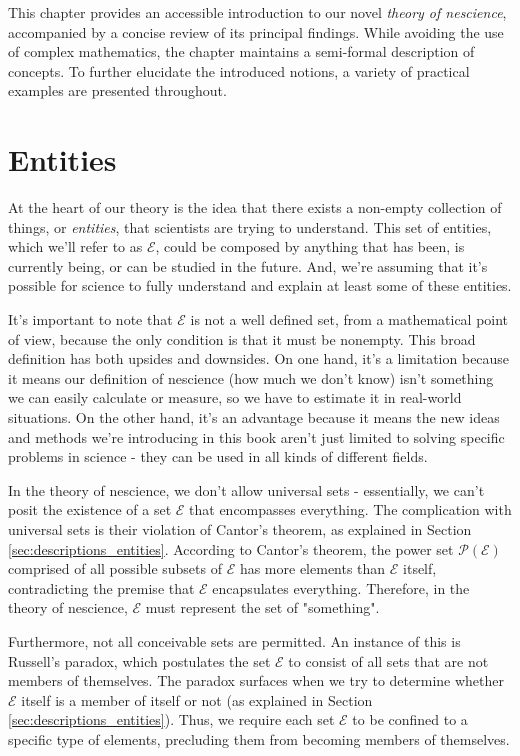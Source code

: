 This chapter provides an accessible introduction to our novel \emph{theory of nescience}, accompanied by a concise review of its principal findings. While avoiding the use of complex mathematics, the chapter maintains a semi-formal description of concepts. To further elucidate the introduced notions, a variety of practical examples are presented throughout.

%
%

\section{Entities}

At the heart of our theory is the idea that there exists a non-empty collection of things, or \emph{entities}, that scientists are trying to understand. This set of entities, which we'll refer to as $\mathcal{E}$, could be composed by anything that has been, is currently being, or can be studied in the future. And, we're assuming that it's possible for science to fully understand and explain at least some of these entities.

It's important to note that $\mathcal{E}$ is not a well defined set, from a mathematical point of view, because the only condition is that it must be nonempty. This broad definition has both upsides and downsides. On one hand, it's a limitation because it means our definition of nescience (how much we don't know) isn't something we can easily calculate or measure, so we have to estimate it in real-world situations. On the other hand, it's an advantage because it means the new ideas and methods we're introducing in this book aren't just limited to solving specific problems in science - they can be used in all kinds of different fields.

In the theory of nescience, we don't allow universal sets - essentially, we can't posit the existence of a set $\mathcal{E}$ that encompasses everything. The complication with universal sets is their violation of Cantor's theorem, as explained in Section \ref{sec:descriptions_entities}. According to Cantor's theorem, the power set $\mathcal{P}(\mathcal{E})$ comprised of all possible subsets of $\mathcal{E}$ has more elements than $\mathcal{E}$ itself, contradicting the premise that $\mathcal{E}$ encapsulates everything. Therefore, in the theory of nescience, $\mathcal{E}$ must represent the set of "something". 

Furthermore, not all conceivable sets are permitted. An instance of this is Russell's paradox, which postulates the set $\mathcal{E}$ to consist of all sets that are not members of themselves. The paradox surfaces when we try to determine whether $\mathcal{E}$ itself is a member of itself or not (as explained in Section \ref{sec:descriptions_entities}). Thus, we require each set $\mathcal{E}$ to be confined to a specific type of elements, precluding them from becoming members of themselves.

